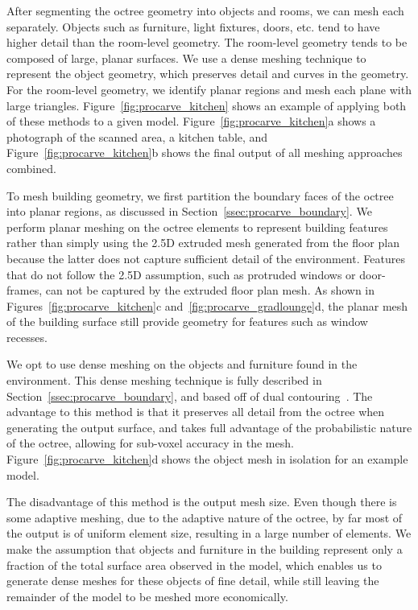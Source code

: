 \documentclass[12pt,onecolumn,oneside]{book}
\begin{document}
After segmenting the octree geometry into objects and rooms, we can mesh each separately.  Objects such as furniture, light fixtures, doors, etc. tend to have higher detail than the room-level geometry.  The room-level geometry tends to be composed of large, planar surfaces.  We use a dense meshing technique to represent the object geometry, which preserves detail and curves in the geometry.  For the room-level geometry, we identify planar regions and mesh each plane with large triangles.  Figure~\ref{fig:procarve_kitchen} shows an example of applying both of these methods to a given model.  Figure~\ref{fig:procarve_kitchen}a shows a photograph of the scanned area, a kitchen table, and Figure~\ref{fig:procarve_kitchen}b shows the final output of all meshing approaches combined.

To mesh building geometry, we first partition the boundary faces of the octree into planar regions, as discussed in Section~\ref{ssec:procarve_boundary}.   We perform planar meshing on the octree elements to represent building features rather than simply using the 2.5D extruded mesh generated from the floor plan because the latter does not capture sufficient detail of the environment.  Features that do not follow the 2.5D assumption, such as protruded windows or door-frames, can not be captured by the extruded floor plan mesh.  As shown in Figures~\ref{fig:procarve_kitchen}c and~\ref{fig:procarve_gradlounge}d, the planar mesh of the building surface still provide geometry for features such as window recesses.

We opt to use dense meshing on the objects and furniture found in the environment.  This dense meshing technique is fully described in Section~\ref{ssec:procarve_boundary}, and based off of dual contouring~\cite{DualContouring}.  The advantage to this method is that it preserves all detail from the octree when generating the output surface, and takes full advantage of the probabilistic nature of the octree, allowing for sub-voxel accuracy in the mesh.  Figure~\ref{fig:procarve_kitchen}d shows the object mesh in isolation for an example model.  

The disadvantage of this method is the output mesh size.  Even though there is some adaptive meshing, due to the adaptive nature of the octree, by far most of the output is of uniform element size, resulting in a large number of elements.  We make the assumption that objects and furniture in the building represent only a fraction of the total surface area observed in the model, which enables us to generate dense meshes for these objects of fine detail, while still leaving the remainder of the model to be meshed more economically.
\end{document}

